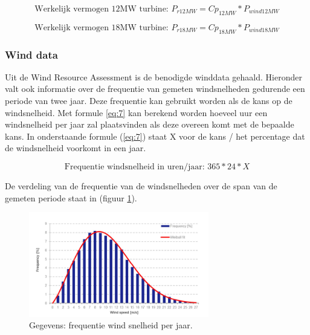 \begin{equation} \label{eq:5}
\text{Werkelijk vermogen 12MW turbine: } P_{r12MW}=Cp_{12MW}*P_{wind12MW}
\end{equation}

\begin{equation} \label{eq:6}
\text{Werkelijk vermogen 18MW turbine: } P_{r18MW}=Cp_{18MW}*P_{wind18MW}
\end{equation}

\subsubsection{Wind data}
Uit de Wind Resource Assessment\cite{WindResourceAssessment} is de benodigde winddata gehaald. Hieronder valt ook informatie over de frequentie van gemeten windsnelheden gedurende een periode van twee jaar. Deze frequentie kan gebruikt worden als de kans op de windsnelheid. Met formule \ref{eq:7} kan berekend worden hoeveel uur een windsnelheid per jaar zal plaatsvinden als deze overeen komt met de bepaalde kans. In onderstaande formule (\ref{eq:7}) staat X voor de kans / het percentage dat de windsnelheid voorkomt in een jaar. 

\begin{equation} \label{eq:7}
\text{Frequentie windsnelheid in uren/jaar: } 365*24*X 
\end{equation}


De verdeling van de frequentie van de windsnelheden over de span van de gemeten periode\cite{WindResourceAssessment} staat in (figuur \ref{fig:Frequentieverdeling}). 
\begin{figure}[H]
\centering
\includegraphics[width=0.7\textwidth]{IMG/data/overzicht/Frequentieverdelingwind.PNG}
\caption{Gegevens: frequentie wind snelheid per jaar.}
\label{fig:Frequentieverdeling}
\end{figure}

